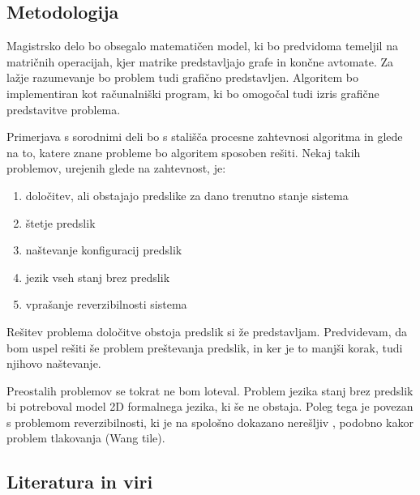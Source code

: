 \documentclass[a4paper, 12pt]{article}
\begin{document}
\subsection{Metodologija}

Magistrsko delo bo obsegalo matematičen model, ki bo predvidoma temeljil na matričnih operacijah,
kjer matrike predstavljajo grafe in končne avtomate.
Za lažje razumevanje bo problem tudi grafično predstavljen.
Algoritem bo implementiran kot računalniški program, ki bo omogočal tudi izris grafične predstavitve
problema.

Primerjava s sorodnimi deli bo s stališča procesne zahtevnosi algoritma in glede na to,
katere znane probleme bo algoritem sposoben rešiti. Nekaj takih problemov, urejenih glede na zahtevnost, je:
\begin{enumerate}
\item določitev, ali obstajajo predslike za dano trenutno stanje sistema
\item štetje predslik
\item naštevanje konfiguracij predslik
\item jezik vseh stanj brez predslik
\item vprašanje reverzibilnosti sistema
\end{enumerate}

Rešitev problema določitve obstoja predslik si že predstavljam. 
Predvidevam, da bom uspel rešiti še problem preštevanja predslik, in ker je to manjši korak, tudi njihovo naštevanje.

Preostalih problemov se tokrat ne bom loteval.
Problem jezika stanj brez predslik bi potreboval model 2D formalnega jezika, ki še ne obstaja.
Poleg tega je povezan s problemom reverzibilnosti, ki je na spološno dokazano nerešljiv \cite{Kari1989}, podobno kakor problem tlakovanja (Wang tile).

\subsection{Literatura in viri}
\label{literatura}

\renewcommand\refname{}
\vspace{-50px}


\end{document}
